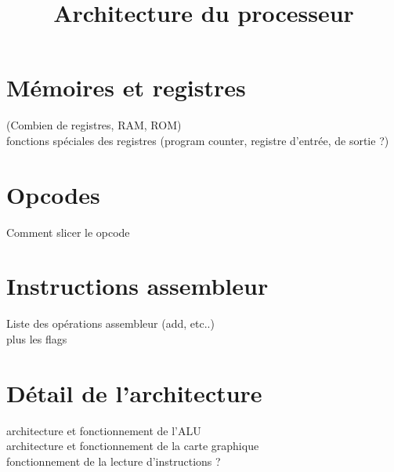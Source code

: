 \documentclass[a4paper]{article}
\title{Architecture du processeur}
\begin{document}
\maketitle

\section{Mémoires et registres}

(Combien de registres, RAM, ROM)\\
fonctions spéciales des registres (program counter, registre d'entrée, de sortie ?)

\section{Opcodes}

Comment slicer le opcode

\section{Instructions assembleur}

Liste des opérations assembleur (add, etc..)\\
plus les flags

\section{Détail de l'architecture}

architecture et fonctionnement de l'ALU\\
architecture et fonctionnement de la carte graphique\\
fonctionnement de la lecture d'instructions ?
\end{document}
